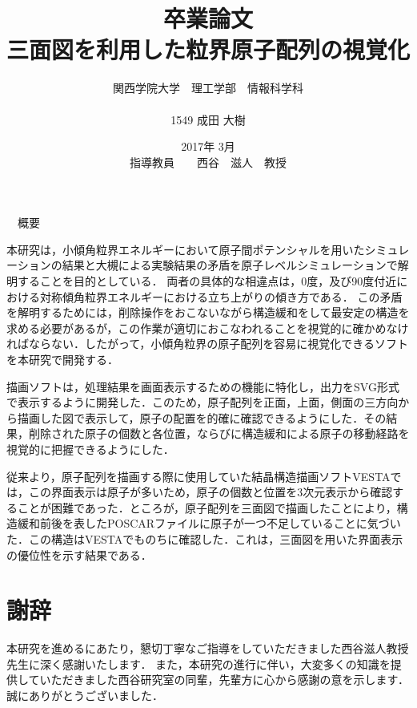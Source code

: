 \documentclass[12pt,a4paper]{jsarticle}
\begin{document}
\title{卒業論文\\
\vspace{4cm} 三面図を利用した粒界原子配列の視覚化}
\author{ 関西学院大学　理工学部　情報科学科\\\\1549 成田 大樹}
\date{\vspace{3cm} 2017年  3月\\
\vspace{3cm} 指導教員　　西谷　滋人　教授}
\maketitle
\thispagestyle{empty}
\newpage
\thispagestyle{empty}
\begin{center}
\large　概要
\end{center}

本研究は，小傾角粒界エネルギーにおいて原子間ポテンシャルを用いたシミュレーションの結果と大槻による実験結果の矛盾を原子レベルシミュレーションで解明することを目的としている．
両者の具体的な相違点は，0度，及び90度付近における対称傾角粒界エネルギーにおける立ち上がりの傾き方である．
この矛盾を解明するためには，削除操作をおこないながら構造緩和をして最安定の構造を求める必要があるが，この作業が適切におこなわれることを視覚的に確かめなければならない．したがって，小傾角粒界の原子配列を容易に視覚化できるソフトを本研究で開発する．

描画ソフトは，処理結果を画面表示するための機能に特化し，出力をSVG形式で表示するように開発した．このため，原子配列を正面，上面，側面の三方向から描画した図で表示して，原子の配置を的確に確認できるようにした．その結果，削除された原子の個数と各位置，ならびに構造緩和による原子の移動経路を視覚的に把握できるようにした．

従来より，原子配列を描画する際に使用していた結晶構造描画ソフトVESTAでは，この界面表示は原子が多いため，原子の個数と位置を3次元表示から確認することが困難であった．ところが，原子配列を三面図で描画したことにより，構造緩和前後を表したPOSCARファイルに原子が一つ不足していることに気づいた．この構造はVESTAでものちに確認した．これは，三面図を用いた界面表示の優位性を示す結果である．

\addtocounter{page}{-2}
\newpage
\setcounter{tocdepth}{4}
\tableofcontents








\section*{謝辞}
本研究を進めるにあたり，懇切丁寧なご指導をしていただきました西谷滋人教授先生に深く感謝いたします． また，本研究の進行に伴い，大変多くの知識を提供していただきました西谷研究室の同輩，先輩方に心から感謝の意を示します． 誠にありがとうございました．


\end{document}
